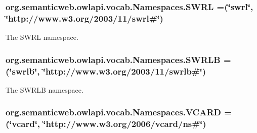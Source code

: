 \hypertarget{enumorg_1_1semanticweb_1_1owlapi_1_1vocab_1_1_namespaces_aaef6dd17f5027ab54711f35606c08964}{
\subsubsection[{S\-W\-R\-L}]{\setlength{\rightskip}{0pt plus 5cm}org.\-semanticweb.\-owlapi.\-vocab.\-Namespaces.\-S\-W\-R\-L =(\char`\"{}swrl\char`\"{}, \char`\"{}http\-://www.\-w3.\-org/2003/11/swrl\#\char`\"{})}}\label{enumorg_1_1semanticweb_1_1owlapi_1_1vocab_1_1_namespaces_aaef6dd17f5027ab54711f35606c08964}
The S\-W\-R\-L namespace. \hypertarget{enumorg_1_1semanticweb_1_1owlapi_1_1vocab_1_1_namespaces_a2a7fc9fa3210353720c12879b672db41}{
\subsubsection[{S\-W\-R\-L\-B}]{\setlength{\rightskip}{0pt plus 5cm}org.\-semanticweb.\-owlapi.\-vocab.\-Namespaces.\-S\-W\-R\-L\-B =(\char`\"{}swrlb\char`\"{}, \char`\"{}http\-://www.\-w3.\-org/2003/11/swrlb\#\char`\"{})}}\label{enumorg_1_1semanticweb_1_1owlapi_1_1vocab_1_1_namespaces_a2a7fc9fa3210353720c12879b672db41}
The S\-W\-R\-L\-B namespace. \hypertarget{enumorg_1_1semanticweb_1_1owlapi_1_1vocab_1_1_namespaces_a0f941abbdb2c19ad2cd941f776fc4834}{
\subsubsection[{V\-C\-A\-R\-D}]{\setlength{\rightskip}{0pt plus 5cm}org.\-semanticweb.\-owlapi.\-vocab.\-Namespaces.\-V\-C\-A\-R\-D =(\char`\"{}vcard\char`\"{}, \char`\"{}http\-://www.\-w3.\-org/2006/vcard/{\bf ns}\#\char`\"{})}}\label{enumorg_1_1semanticweb_1_1owlapi_1_1vocab_1_1_namespaces_a0f941abbdb2c19ad2cd941f776fc4834}
